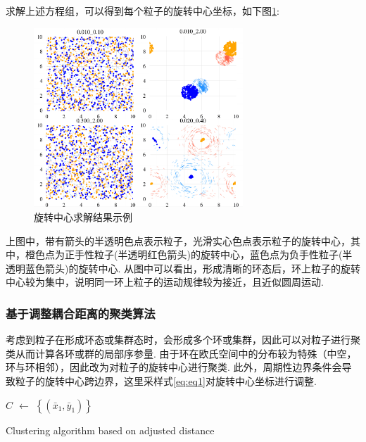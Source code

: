 \documentclass{article}
\begin{document}
求解上述方程组，可以得到每个粒子的旋转中心坐标，如下图\ref{fig:fig232.2}:%

\begin{figure}[H]
	\centering
	\includegraphics[width=0.7\textwidth]{./figs/centorsBigGraph_sub.png}
	\vspace{-0.2cm}
	\caption{旋转中心求解结果示例}
	\label{fig:fig232.2}
\end{figure}

上图中，带有箭头的半透明色点表示粒子，光滑实心色点表示粒子的旋转中心，其中，橙色点为正手性粒子(半透明红色箭头)的旋转中心，蓝色点为负手性粒子(半透明蓝色箭头)的旋转中心. 从图中可以看出，形成清晰的环态后，环上粒子的旋转中心较为集中，说明同一环上粒子的运动规律较为接近，且近似圆周运动.



\subsubsection{基于调整耦合距离的聚类算法}\label{clustering}

考虑到粒子在形成环态或集群态时，会形成多个环或集群，因此可以对粒子进行聚类从而计算各环或群的局部序参量. 由于环在欧氏空间中的分布较为特殊（中空，环与环相邻），因此改为对粒子的旋转中心进行聚类. 此外，周期性边界条件会导致粒子的旋转中心跨边界，这里采样式\ref{eq:eq1}对旋转中心坐标进行调整.

\begin{algorithm}

	\BlankLine
	\emph{$C$ $\leftarrow$ $\left\{(\bar{x}_1, \bar{y}_1)\right\}$}\;
	\caption{Clustering algorithm based on adjusted distance}\label{algo_disjdecomp}
\end{algorithm}\DecMargin{1em}
\end{document}
